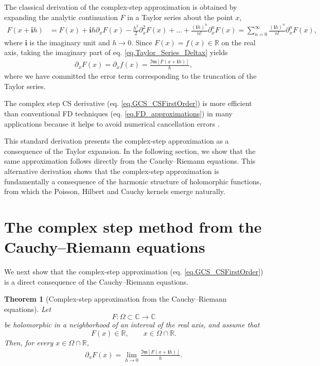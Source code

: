 \documentclass[11pt]{article}
\newtheorem{theorem}{Theorem}[section]
\newcommand{\imag}{\textbf{i}}
\newcommand{\ImagPart}{\mathfrak{Im}}
\begin{document}
	The classical derivation of the complex-step approximation \citep{Squire1998} is obtained by expanding the analytic continuation \(F\) in a Taylor series about the point \(x\),
	\begin{align}
		F(x + \imag h) & = F(x) + \imag h \partial_x F (x) - \frac{h^2}{2} \partial_x^2 F (x)  + ... + \frac{(\imag h)^n}{n!} \partial_x^n F(x)  = \sum_{n=0}^{\infty}\frac{(\imag h)^{n}}{n!}\partial_x^n  F(x),
		\label{eq.Taylor_Series_Deltax}
	\end{align}
	where $\imag$ is the imaginary unit and $h\to 0$. Since \(F(x)=f(x)\in\mathbb R\) on the real axis, taking the imaginary part of eq. \eqref{eq.Taylor_Series_Deltax} yields
	\begin{align}
		\partial_x F (x)  = \partial_x f (x) = \frac{\ImagPart \left[F(x+\imag h)\right]}{h} ,
		\label{eq.GCS_CSFirstOrder}
	\end{align}
	where we have committed the error term corresponding to the truncation of the Taylor series. 
	
	The complex step CS derivative (eq. \eqref{eq.GCS_CSFirstOrder}) is more efficient than conventional FD techniques (eq. \eqref{eq.FD_approximations}) in many applications because it helps to avoid numerical cancellation errors \citep[e.g.][]{anderson2001sensitivity,al2010complex,Voorhees20111146,martins2001connection,martins2003complex,dziatkiewicz2016complex,Jin2010,Kim2006177,Burg2003,Wang2006,ridout2009,Abreu201384,Abreu01072015,ABREU2018390}.
	
	This standard derivation presents the complex-step approximation as a consequence of the Taylor expansion. In the following section, we show that the same approximation follows directly from the Cauchy--Riemann equations. This alternative derivation shows that the complex-step approximation is fundamentally a consequence of the harmonic structure of holomorphic functions, from which the Poisson, Hilbert and Cauchy kernels emerge naturally.
	
	\section{The complex step method from the Cauchy--Riemann equations}
	
	We next show that the complex-step approximation (eq. \eqref{eq.GCS_CSFirstOrder}) is a direct consequence of the Cauchy--Riemann equations.
	
	\begin{theorem}[Complex-step approximation from the Cauchy--Riemann equations]
		Let
		\[
		F:\Omega\subset\mathbb{C}\rightarrow\mathbb{C}
		\]
		be holomorphic in a neighborhood of an interval of the real axis, and assume that
		\[
		F(x)\in\mathbb{R},
		\qquad x\in\Omega\cap\mathbb{R}.
		\]
		Then, for every
		\(x\in\Omega\cap\mathbb{R}\),
		\begin{align}
			\partial_xF(x)
			=
			\lim_{h\rightarrow0}
			\frac{\ImagPart\!\left[F(x+\imag h)\right]}{h}.
			\label{eq.Complex_Step_relation}
		\end{align}
	\end{theorem}
	
\end{document}

